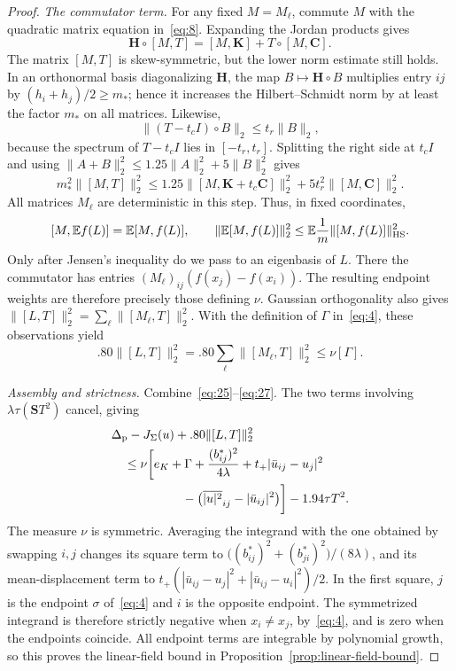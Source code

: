 \begin{proof}
\smallskip\noindent\emph{The commutator term.}
For any fixed \(M=M_\ell\), commute \(M\) with the quadratic matrix
equation in~\eqref{eq:8}.  Expanding the Jordan products gives
\[
 \mathbf H\circ[M,T]=[M,\mathbf K]+T\circ[M,\mathbf C].
\]
The matrix \([M,T]\) is skew-symmetric, but the lower norm estimate still
holds.  In an orthonormal basis diagonalizing \(\mathbf H\), the map
\(B\mapsto\mathbf H\circ B\) multiplies entry \(ij\) by
\((h_i+h_j)/2\ge m_*\); hence it increases the Hilbert--Schmidt norm by
at least the factor \(m_*\) on all matrices.  Likewise,
\[
 \|(T-t_cI)\circ B\|_2\le t_r\|B\|_2,
\]
because the spectrum of \(T-t_cI\) lies in \([-t_r,t_r]\).
Splitting the right side at \(t_cI\) and using
\(\|A+B\|_2^2\le1.25\|A\|_2^2+5\|B\|_2^2\) gives
\[
 m_*^2\|[M,T]\|_2^2
 \le1.25\|[M,\mathbf K+t_c\mathbf C]\|_2^2
       +5t_r^2\|[M,\mathbf C]\|_2^2.
\]
All matrices \(M_\ell\) are deterministic in this step.  Thus, in fixed
coordinates,
\[
 [M,\mathbb E f(L)]=\mathbb E[M,f(L)],
 \qquad
 \|\mathbb E[M,f(L)]\|_2^2
      \le\mathbb E\frac1m\|[M,f(L)]\|_{\rm HS}^2.
\]
Only after Jensen's inequality do we pass to an eigenbasis of \(L\).
There the commutator has entries
\((M_\ell)_{ij}(f(x_j)-f(x_i))\).  The resulting endpoint weights are
therefore precisely those defining \(\nu\).  Gaussian orthogonality also
gives \(\|[L,T]\|_2^2=\sum_\ell\|[M_\ell,T]\|_2^2\).
With the definition of \(\Gamma\) in~\eqref{eq:4}, these observations yield
\[
 .80\|[L,T]\|_2^2
       =.80\sum_\ell\|[M_\ell,T]\|_2^2\le\nu[\Gamma].
 \tag{27}\label{eq:27}
\]

\smallskip\noindent\emph{Assembly and strictness.}
Combine~\eqref{eq:25}--\eqref{eq:27}.  The two terms involving
\(\lambda\tau(\mathbf S T^2)\) cancel, giving
\[
 \begin{aligned}
 &\Delta_{\rm p}-J_\Sigma(u)+.80\|[L,T]\|_2^2\\
 &\quad\le\nu\biggl[e_K+\Gamma
       +\frac{(b_{ij}^*)^2}{4\lambda}
       +t_+|\bar u_{ij}-u_j|^2\\
 &\hspace{20mm}
       -\bigl(\overline{|u|^2}_{ij}-|\bar u_{ij}|^2\bigr)\biggr]
       -1.94\tau T^2.
 \end{aligned}
\]
The measure \(\nu\) is symmetric.  Averaging the integrand with the one
obtained by swapping \(i,j\) changes its square term to
\(\bigl((b_{ij}^*)^2+(b_{ji}^*)^2\bigr)/(8\lambda)\), and its
mean-displacement term to
\(t_+(|\bar u_{ij}-u_j|^2+|\bar u_{ij}-u_i|^2)/2\).
In the first square, \(j\) is the endpoint \(\sigma\) of~\eqref{eq:4}
and \(i\) is the opposite endpoint.  The symmetrized integrand is therefore
strictly negative when \(x_i\ne x_j\), by~\eqref{eq:4}, and is zero when
the endpoints coincide.  All endpoint terms are integrable by polynomial
growth, so this proves the linear-field bound in
Proposition~\ref{prop:linear-field-bound}.


\end{proof}

